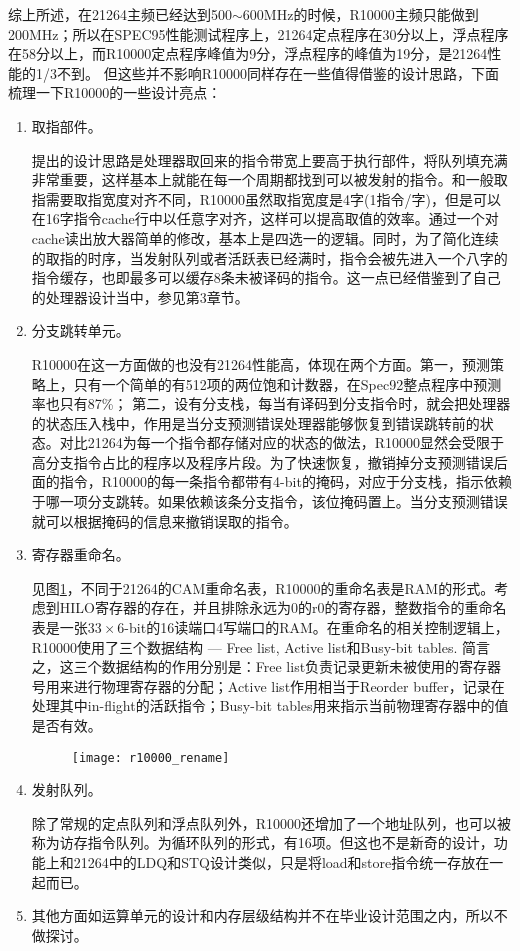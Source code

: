 	综上所述，在21264主频已经达到500$ \sim $600MHz的时候，R10000主频只能做到200MHz；所以在SPEC95性能测试程序上，21264定点程序在30分以上，浮点程序在58分以上，而R10000定点程序峰值为9分，浮点程序的峰值为19分，是21264性能的1/3不到\citep{Alpha21264,MIPS1996}。 但这些并不影响R10000同样存在一些值得借鉴的设计思路，下面梳理一下R10000的一些设计亮点：
	\begin{enumerate}[label=(\alph*)]
		\item 取指部件。
		
		\citep{MIPS1996}提出的设计思路是处理器取回来的指令带宽上要高于执行部件，将队列填充满非常重要，这样基本上就能在每一个周期都找到可以被发射的指令。和一般取指需要取指宽度对齐不同，R10000虽然取指宽度是4字(1指令/字)，但是可以在16字指令cache行中以任意字对齐，这样可以提高取值的效率。通过一个对cache读出放大器简单的修改，基本上是四选一的逻辑。同时，为了简化连续的取指的时序，当发射队列或者活跃表已经满时，指令会被先进入一个八字的指令缓存\citep{MIPS1996}，也即最多可以缓存8条未被译码的指令。这一点已经借鉴到了自己的处理器设计当中，参见第3章节。
		\item 分支跳转单元。
		
		R10000在这一方面做的也没有21264性能高，体现在两个方面。第一，预测策略上，只有一个简单的有512项的两位饱和计数器，在Spec92整点程序中预测率也只有87\%\citep{MIPS1996}； 第二，设有分支栈，每当有译码到分支指令时，就会把处理器的状态压入栈中，作用是当分支预测错误处理器能够恢复到错误跳转前的状态。对比21264为每一个指令都存储对应的状态的做法，R10000显然会受限于高分支指令占比的程序以及程序片段。为了快速恢复，撤销掉分支预测错误后面的指令，R10000的每一条指令都带有4-bit的掩码，对应于分支栈，指示依赖于哪一项分支跳转。如果依赖该条分支指令，该位掩码置上。当分支预测错误就可以根据掩码的信息来撤销误取的指令。
		\item 寄存器重命名。
		
		见图\ref{fig:r10000_rename}，不同于21264的CAM重命名表，R10000的重命名表是RAM的形式。考虑到HILO寄存器的存在，并且排除永远为$ 0 $的r0的寄存器，整数指令的重命名表是一张$ 33\times 6 $-bit的16读端口4写端口的RAM\citep{MIPS1996}。在重命名的相关控制逻辑上，R10000使用了三个数据结构 --- Free list, Active list和Busy-bit tables. 简言之，这三个数据结构的作用分别是：Free list负责记录更新未被使用的寄存器号用来进行物理寄存器的分配；Active list作用相当于Reorder buffer，记录在处理其中in-flight的活跃指令；Busy-bit tables用来指示当前物理寄存器中的值是否有效。
		\begin{figure}[!htbp]
			\centering
			\texttt{[image: r10000\_rename]}
			\label{fig:r10000_rename}
		\end{figure}
		
		\item 发射队列。
		
		除了常规的定点队列和浮点队列外，R10000还增加了一个地址队列，也可以被称为访存指令队列。为循环队列的形式，有16项。但这也不是新奇的设计，功能上和21264中的LDQ和STQ设计类似，只是将load和store指令统一存放在一起而已。
		\item 其他方面如运算单元的设计和内存层级结构并不在毕业设计范围之内，所以不做探讨。
	\end{enumerate}

